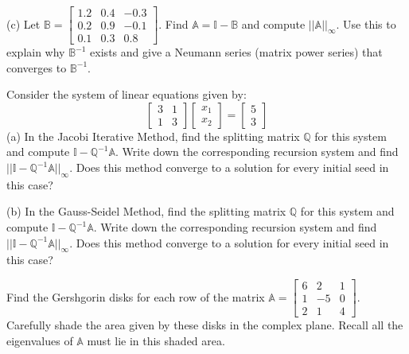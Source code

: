 \documentclass[12pt]{article}
\begin{document}
\vspace{ 2in}

\noindent
(c) Let $\mathbb{B}= \begin{bmatrix} 1.2 & 0.4 & -0.3 \\ 0.2 & 0.9 & -0.1 \\ 0.1 & 0.3 & 0.8 \end{bmatrix}$.
Find $\mathbb{A}=\mathbb{I} - \mathbb{B}$ and compute $||\mathbb{A}||_{\infty}$. 
Use this to explain why $\mathbb{B}^{-1}$ exists and give a Neumann series (matrix power series) that converges to $\mathbb{B}^{-1}$. \\

\vspace{ 3 in}

\noindent
Consider the system of linear equations given by:
$$
\begin{bmatrix} 3 & 1  \\ 1 & 3   \end{bmatrix}
\begin{bmatrix} x_1 \\ x_2  \end{bmatrix}
=
\begin{bmatrix} 5 \\ 3  \end{bmatrix}
$$
(a) In the Jacobi Iterative Method, find the splitting matrix $\mathbb{Q}$ for this system and compute 
$\mathbb{I} - \mathbb{Q}^{-1} \mathbb{A}$. Write down the corresponding recursion system and 
find $|| \mathbb{I}-\mathbb{Q}^{-1}\mathbb{A}||_{\infty}$. Does this method converge to a solution 
for every initial seed in this case? \\

\newpage

\noindent
(b) In the Gauss-Seidel Method, find the splitting matrix $\mathbb{Q}$ for this system and compute 
$\mathbb{I} - \mathbb{Q}^{-1} \mathbb{A}$. Write down the corresponding recursion system and 
find $|| \mathbb{I}-\mathbb{Q}^{-1}\mathbb{A}||_{\infty}$. Does this method converge to a solution for every initial seed in this case?\\

\vspace{3in}

Find the Gershgorin disks for each row of the matrix $\mathbb{A} = \begin{bmatrix} 6 & 2 & 1 \\ 1 & -5 & 0 \\ 2 & 1 & 4 \end{bmatrix}$. 
Carefully shade the area given by these disks in the complex plane. Recall all the eigenvalues of $\mathbb{A}$ must lie in this shaded area.
\end{document}
